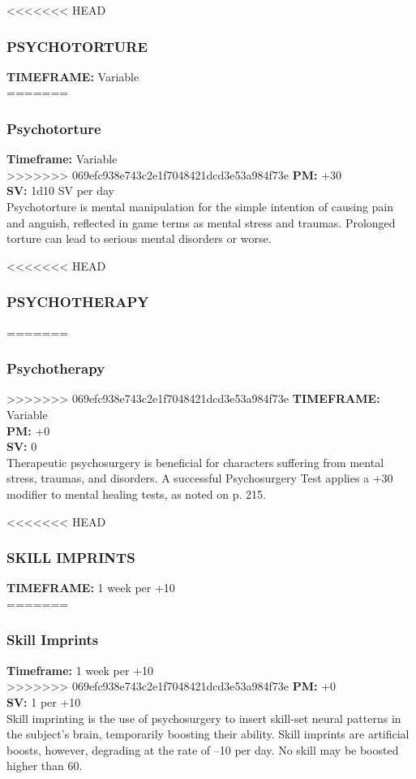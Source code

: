 <<<<<<< HEAD
\subsubsection{PSYCHOTORTURE}
\textbf{TIMEFRAME:} Variable \\
=======
\subsubsection{Psychotorture}
\textbf{Timeframe:} Variable \\
>>>>>>> 069efc938e743c2e1f7048421dcd3e53a984f73e
\textbf{PM:} +30 \\
\textbf{SV:} 1d10 SV per day \\
Psychotorture is mental manipulation for the simple
intention of causing pain and anguish, reflected in
game terms as mental stress and traumas. Prolonged
torture can lead to serious mental disorders or worse.

<<<<<<< HEAD
\subsubsection{PSYCHOTHERAPY}
=======
\subsubsection{Psychotherapy}
>>>>>>> 069efc938e743c2e1f7048421dcd3e53a984f73e
\textbf{TIMEFRAME:} Variable \\
\textbf{PM:} +0 \\
\textbf{SV:} 0 \\
Therapeutic psychosurgery is beneficial for characters
suffering from mental stress, traumas, and disorders. A
successful Psychosurgery Test applies a +30 modifier
to mental healing tests, as noted on p. 215.

<<<<<<< HEAD
\subsubsection{SKILL IMPRINTS}
\textbf{TIMEFRAME:} 1 week per +10 \\
=======
\subsubsection{Skill Imprints}
\textbf{Timeframe:} 1 week per +10 \\
>>>>>>> 069efc938e743c2e1f7048421dcd3e53a984f73e
\textbf{PM:} +0 \\
\textbf{SV:} 1 per +10 \\
Skill imprinting is the use of psychosurgery to insert
skill-set neural patterns in the subject’s brain, temporarily
boosting their ability. Skill imprints are artificial
boosts, however, degrading at the rate of –10 per day.
No skill may be boosted higher than 60.

